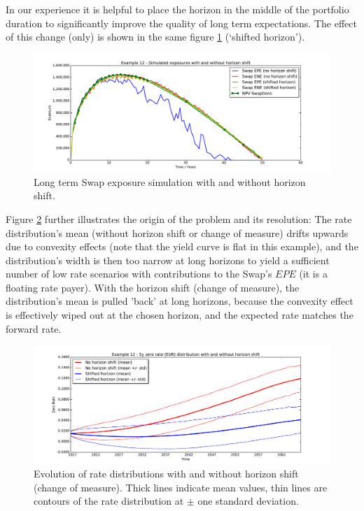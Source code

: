 \documentclass[12pt, a4paper]{article}
\newcommand{\EPE}{\mathit{EPE}}
\begin{document}
In our experience it is helpful to place the horizon in the middle of the portfolio duration to significantly improve
the quality of long term expectations. The effect of this change (only) is shown in the same figure \ref{fig_15}
(`shifted horizon').
\begin{figure}[h!]
\begin{center}
\includegraphics[scale=0.45]{mpl_longterm.pdf}
\end{center}
\caption{Long term Swap exposure simulation with and without horizon shift.}
\label{fig_15}
\end{figure}
Figure \ref{fig_15b} further illustrates the origin of the problem and its resolution: The rate distribution's mean
(without horizon shift or change of measure) drifts upwards due to convexity effects (note that the yield curve is flat
in this example), and the distribution's width is then too narrow at long horizons to yield a sufficient number of low
rate scenarios with contributions to the Swap's $\EPE$ (it is a floating rate payer). With the horizon shift (change of
measure), the distribution's mean is pulled 'back' at long horizons, because the convexity effect is effectively wiped
out at the chosen horizon, and the expected rate matches the forward rate.

\begin{figure}[h!]
\begin{center}
\includegraphics[scale=0.45]{mpl_rates.pdf}
\end{center}
\caption{Evolution of rate distributions with and without horizon shift (change of measure). Thick lines indicate mean
  values, thin lines are contours of the rate distribution at $\pm$ one standard deviation.}
\label{fig_15b}
\end{figure}
\end{document}

